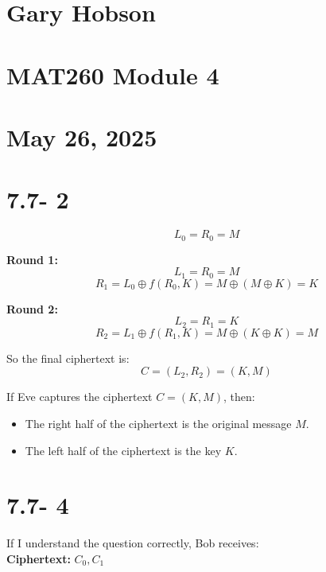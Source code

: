 \documentclass[12pt]{article}
\begin{document}
\section*{Gary Hobson}
\section*{MAT260 Module 4}
\section*{May 26, 2025}

\newpage





\section*{7.7- 2}

\[
L_0 = R_0 = M
\]

\textbf{Round 1:}
\[
L_1 = R_0 = M
\]
\[
R_1 = L_0 \oplus f(R_0, K) = M \oplus (M \oplus K) = K
\]

\textbf{Round 2:}
\[
L_2 = R_1 = K
\]
\[
R_2 = L_1 \oplus f(R_1, K) = M \oplus (K \oplus K) = M
\]

So the final ciphertext is:
\[
C = (L_2, R_2) = (K, M)
\]

If Eve captures the ciphertext \( C = (K, M) \), then:
\begin{itemize}
    \item The right half of the ciphertext is the original message \( M \).
    \item The left half of the ciphertext is the key \( K \).
\end{itemize}



\newpage
\section*{7.7- 4}

If I understand the question correctly, Bob receives: \\
\textbf{Ciphertext:} \( C_0, C_1 \)
\end{document}

